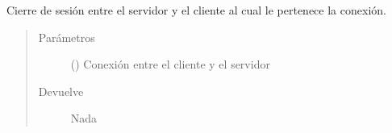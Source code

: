 \documentclass[letterpaper,10pt,spanish,openany,oneside]{sphinxmanual}
\begin{document}

\begin{fulllineitems}
\label{\detokenize{pokemonServer:pokemonServer.cerrarSesion}}
Cierre de sesión entre el servidor y el cliente al cual le pertenece la conexión.
\begin{quote}\begin{description}
\item[{Parámetros}] \leavevmode
{} () \textendash{} Conexión entre el cliente y el servidor

\item[{Devuelve}] \leavevmode
Nada

\end{description}\end{quote}

\end{fulllineitems}

\end{document}
